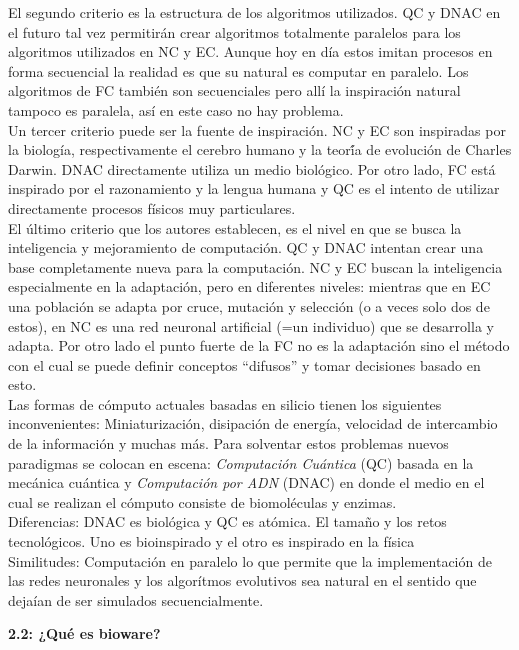 \documentclass[10pt,onecolumn,twoside,letterpaper]{article}
\begin{document}
El segundo criterio es la estructura de los algoritmos utilizados. QC y DNAC en el futuro tal vez permitir\'an crear algoritmos totalmente paralelos para los algoritmos utilizados en NC y EC. Aunque hoy en d\'ia estos imitan procesos en forma secuencial la realidad es que su natural es computar en paralelo. Los algoritmos de FC tambi\'en son secuenciales pero all\'i la inspiraci\'on natural tampoco es paralela, as\'i en este caso no hay problema.\\
Un tercer criterio puede ser la fuente de inspiraci\'on. NC y EC son inspiradas por la biolog\'ia, respectivamente el cerebro humano y la teor\'ía de evoluci\'on de Charles Darwin. DNAC directamente utiliza un medio biol\'ogico. Por otro lado, FC est\'a inspirado por el razonamiento y la lengua humana y QC es el intento de utilizar directamente procesos f\'isicos muy particulares.\\
El \'ultimo criterio que los autores establecen, es el nivel en que se busca la inteligencia y mejoramiento de computación. QC y DNAC intentan crear una base completamente nueva para la computaci\'on. NC y EC buscan la inteligencia especialmente en la adaptaci\'on, pero en diferentes niveles: mientras que en EC una poblaci\'on se adapta por cruce, mutaci\'on y selecci\'on (o a veces solo dos de estos), en NC es una red neuronal artificial (=un individuo) que se desarrolla y adapta. Por otro lado el punto fuerte de la FC no es la adaptaci\'on sino el m\'etodo con el cual se puede definir conceptos ``difusos'' y tomar decisiones basado en esto.\\
Las formas de c\'omputo actuales basadas en silicio tienen los siguientes inconvenientes: Miniaturizaci\'on, disipaci\'on de energ\'ia, velocidad de intercambio de la informaci\'on y muchas m\'as. Para solventar estos problemas nuevos paradigmas se colocan en escena: \emph{Computaci\'on Cu\'antica} (QC) basada en la mec\'anica cu\'antica y \emph{Computaci\'on por ADN} (DNAC) en donde el medio en el cual se realizan el c\'omputo consiste de biomol\'eculas y enzimas. \\
Diferencias: DNAC es biol\'ogica y QC es at\'omica. El tama\~no y los retos tecnol\'ogicos. Uno es bioinspirado y el otro es inspirado en la f\'isica\\
Similitudes: Computaci\'on en paralelo lo que permite que la implementaci\'on de las redes neuronales y los algor\'itmos evolutivos sea natural en el sentido que deja\'ian de ser simulados secuencialmente.
\par{\bf 2.2: ¿Qu\'e es bioware?}\\
\end{document}
